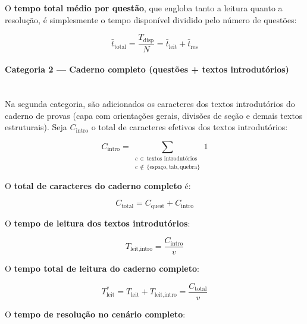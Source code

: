 \documentclass[a4paper,10pt, twocolumn]{article}
\begin{document}
O \textbf{tempo total médio por questão}, que engloba tanto a leitura quanto a resolução, é simplesmente o tempo disponível dividido pelo número de questões:

\begin{equation}
\bar{t}_{\text{total}} = \frac{T_{\text{disp}}}{N} = \bar{t}_{\text{leit}} + \bar{t}_{\text{res}}
\label{eq:tempo_medio_total_questao}
\end{equation}

\paragraph{Categoria 2 — Caderno completo (questões + textos introdutórios)}
\mbox{}\\

Na segunda categoria, são adicionados os caracteres dos textos introdutórios do caderno de provas (capa com orientações gerais, divisões de seção e demais textos estruturais). Seja $C_{\text{intro}}$ o total de caracteres efetivos dos textos introdutórios:

\begin{equation}
C_{\text{intro}} = \sum_{\substack{c \,\in\, \text{textos introdutórios} \\ c \,\notin\, \{\text{espaço}, \text{tab}, \text{quebra}\}}} 1
\label{eq:caracteres_intro}
\end{equation}

O \textbf{total de caracteres do caderno completo} é:

\begin{equation}
C_{\text{total}} = C_{\text{quest}} + C_{\text{intro}}
\label{eq:total_caracteres_completo}
\end{equation}

O \textbf{tempo de leitura dos textos introdutórios}:

\begin{equation}
T_{\text{leit,intro}} = \frac{C_{\text{intro}}}{v}
\label{eq:tempo_leitura_intro}
\end{equation}

O \textbf{tempo total de leitura do caderno completo}:

\begin{equation}
T_{\text{leit}}^{*} = T_{\text{leit}} + T_{\text{leit,intro}} = \frac{C_{\text{total}}}{v}
\label{eq:tempo_leitura_completo}
\end{equation}

O \textbf{tempo de resolução no cenário completo}:
\end{document}
